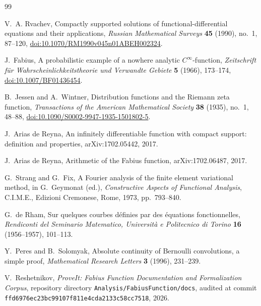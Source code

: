 \documentclass[11pt]{article}
\theoremstyle{definition}
\theoremstyle{remark}
\begin{document}
\begin{thebibliography}{99}

V.~A. Rvachev,
\newblock Compactly supported solutions of functional-differential equations and their applications,
\newblock \emph{Russian Mathematical Surveys} \textbf{45} (1990), no.~1, 87--120,
\newblock \href{https://doi.org/10.1070/RM1990v045n01ABEH002324}{doi:10.1070/RM1990v045n01ABEH002324}.

J.~Fabius,
\newblock A probabilistic example of a nowhere analytic \(C^\infty\)-function,
\newblock \emph{Zeitschrift f\"ur Wahrscheinlichkeitstheorie und Verwandte Gebiete} \textbf{5} (1966), 173--174,
\newblock \href{https://doi.org/10.1007/BF01436454}{doi:10.1007/BF01436454}.

B.~Jessen and A.~Wintner,
\newblock Distribution functions and the Riemann zeta function,
\newblock \emph{Transactions of the American Mathematical Society} \textbf{38} (1935), no.~1, 48--88,
\newblock \href{https://doi.org/10.1090/S0002-9947-1935-1501802-5}{doi:10.1090/S0002-9947-1935-1501802-5}.

J.~Arias de Reyna,
\newblock An infinitely differentiable function with compact support: definition and properties,
\newblock arXiv:1702.05442, 2017.

J.~Arias de Reyna,
\newblock Arithmetic of the Fabius function,
\newblock arXiv:1702.06487, 2017.

G.~Strang and G.~Fix,
\newblock A Fourier analysis of the finite element variational method,
\newblock in G.~Geymonat (ed.), \emph{Constructive Aspects of Functional Analysis}, C.I.M.E., Edizioni Cremonese, Rome, 1973, pp.~793--840.

G.~de Rham,
\newblock Sur quelques courbes d\'efinies par des \'equations fonctionnelles,
\newblock \emph{Rendiconti del Seminario Matematico, Universit\`a e Politecnico di Torino} \textbf{16} (1956--1957), 101--113.

Y.~Peres and B.~Solomyak,
\newblock Absolute continuity of Bernoulli convolutions, a simple proof,
\newblock \emph{Mathematical Research Letters} \textbf{3} (1996), 231--239.

V.~Reshetnikov,
\newblock \emph{ProveIt: Fabius Function Documentation and Formalization Corpus},
\newblock repository directory \texttt{Analysis/FabiusFunction/docs}, audited at commit \texttt{ffd6976ec23bc99107f811e4cda2133c58cc7518}, 2026.

\end{thebibliography}
\end{document}
